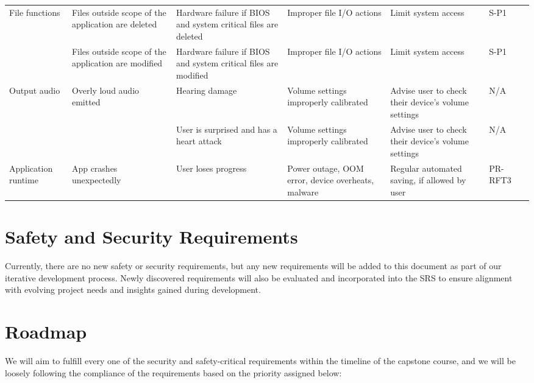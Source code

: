 \documentclass{article}
\begin{document}
\begin{longtable}{|>{\raggedright}p{2cm}|>{\raggedright}p{2.5cm}|>{\raggedright}p{2.5cm}|>{\raggedright}p{2.5cm}|>{\raggedright}p{2.5cm}|p{1.5cm}|p{1.5cm}|}
    File \newline functions & Files outside scope of the application are deleted & Hardware failure if BIOS and system critical files are deleted & Improper file I/O actions & Limit system access & S-P1 & \\
  \cline{2-7}
    & Files outside scope of the application are modified & Hardware failure if BIOS and system critical files are modified & Improper file I/O actions & Limit system access & S-P1 & \\
  \hline
    Output \newline audio & Overly loud audio emitted & Hearing damage & Volume settings improperly calibrated & Advise user to check their device's volume settings & N/A & \\
  \cline{3-7}
    & & User is surprised and has a heart attack & Volume settings improperly calibrated & Advise user to check their device's volume settings & N/A & \\ 
  \hline
    Application runtime & App crashes unexpectedly & User loses progress & Power outage, OOM error, device overheats, malware & Regular automated saving, if allowed by user & PR-RFT3 & \\
  \hline
\end{longtable}

\section{Safety and Security Requirements}

Currently, there are no new safety or security requirements, but any new requirements will be added to this document as part of our iterative development process. Newly discovered requirements will also be evaluated and incorporated into the SRS to ensure alignment with evolving project needs and insights gained during development.


\section{Roadmap}

We will aim to fulfill every one of the security and safety-critical requirements within the timeline of the capstone course, and we will be loosely following the compliance of the requirements based on the priority assigned below:
\end{document}

